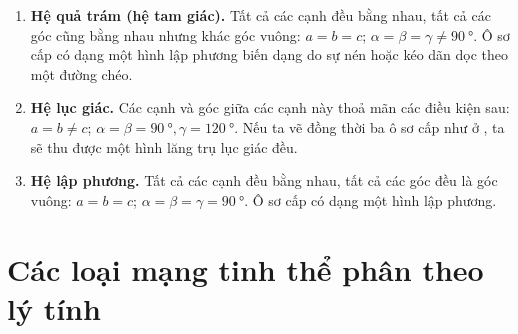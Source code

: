 \begin{enumerate}[1.]

	\item \textbf{Hệ quả trám (hệ tam giác).} Tất cả các cạnh đều bằng nhau, tất cả các góc cũng bằng nhau nhưng khác góc vuông: $a=b=c$; $\alpha=\beta=\gamma\neq\SI{90}{\degree}$. Ô sơ cấp có dạng một hình lập phương biến dạng do sự nén hoặc kéo dãn dọc theo một đường chéo.


	\item \textbf{Hệ lục giác.} Các cạnh và góc giữa các cạnh này thoả mãn các điều kiện sau: $a=b\neq c$; $\alpha=\beta=\SI{90}{\degree}, \gamma=\SI{120}{\degree}$. Nếu ta vẽ đồng thời ba ô sơ cấp như ở , ta sẽ thu được một hình lăng trụ lục giác đều.


	\item \textbf{Hệ lập phương.} Tất cả các cạnh đều bằng nhau, tất cả các góc đều là góc vuông: $a=b=c$; $\alpha=\beta=\gamma=\SI{90}{\degree}$. Ô sơ cấp có dạng một hình lập phương.
\end{enumerate}


\section{Các loại mạng tinh thể phân theo lý tính}\label{sec:13_3}


